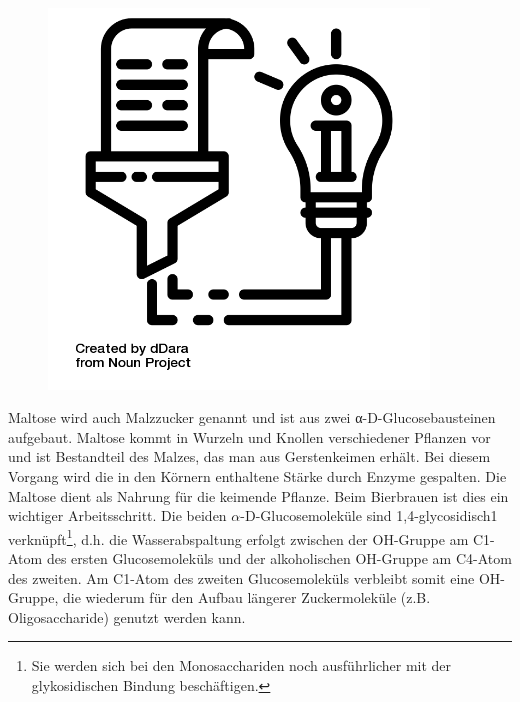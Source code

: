 \documentclass{scrartcl}  %
\begin{document}
\vspace{0.3cm}
			\begin{tcolorbox}[enhanced,
				colback=white,
				colframe=darkgray,
				fonttitle=\sffamily\bfseries\large, 
				title=Maltose,  %
				attach boxed title to top left={xshift=3.2mm,yshift=-0.50mm},
				boxed title style={skin=enhancedfirst jigsaw,size=small,arc=1mm,bottom=-1mm,colframe=darkgray,height=0.75cm},
				colbacktitle=darkgray,
				drop lifted shadow]
				\begin{figure}  
					\centering
					\vspace{-14pt}  %
					\includegraphics[width=0.9\textwidth]{symbols/symbol_tex_content}
				\end{figure}
				
				Maltose wird auch Malzzucker genannt und ist aus zwei α-D-Glucosebausteinen aufgebaut. Maltose kommt in Wurzeln und Knollen verschiedener Pflanzen vor und ist Bestandteil des Malzes, das man aus Gerstenkeimen erhält. Bei diesem Vorgang wird die in den Körnern enthaltene Stärke durch Enzyme gespalten. Die Maltose dient als Nahrung für die keimende Pflanze. Beim Bierbrauen ist dies ein wichtiger Arbeitsschritt. \newline
				Die beiden $\alpha$-D-Glucosemoleküle sind 1,4-glycosidisch1 verknüpft\footnote{Sie werden sich bei den Monosacchariden noch ausführlicher mit der glykosidischen Bindung beschäftigen.}, d.h. die Wasserabspaltung erfolgt zwischen der OH-Gruppe am C1-Atom des ersten Glucosemoleküls und der alkoholischen OH-Gruppe am C4-Atom des zweiten. Am C1-Atom des zweiten Glucosemoleküls verbleibt somit eine OH-Gruppe, die wiederum für den Aufbau längerer Zuckermoleküle (z.B. Oligosaccharide) genutzt werden kann.
				
			\end{tcolorbox}
\end{document}
